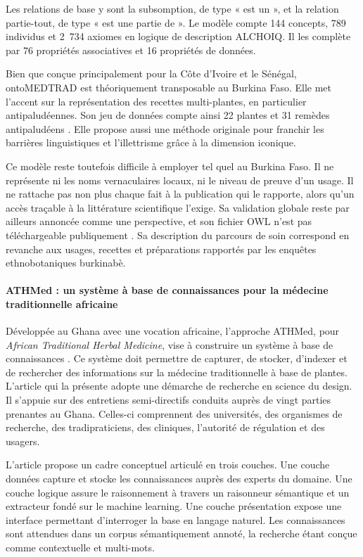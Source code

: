 Les relations de base y sont la subsomption, de type « est un », et la relation partie-tout, de type « est une partie de ». Le modèle compte 144 concepts, 789 individus et 2~734 axiomes en logique de description ALCHOIQ. Il les complète par 76 propriétés associatives et 16 propriétés de données.

Bien que conçue principalement pour la Côte d'Ivoire et le Sénégal, ontoMEDTRAD est théoriquement transposable au Burkina Faso. Elle met l'accent sur la représentation des recettes multi-plantes, en particulier antipaludéennes. Son jeu de données compte ainsi 22 plantes et 31 remèdes antipaludéens \cite{kouame_visual_2020}. Elle propose aussi une méthode originale pour franchir les barrières linguistiques et l'illettrisme grâce à la dimension iconique.

Ce modèle reste toutefois difficile à employer tel quel au Burkina Faso. Il ne représente ni les noms vernaculaires locaux, ni le niveau de preuve d'un usage. Il ne rattache pas non plus chaque fait à la publication qui le rapporte, alors qu'un accès traçable à la littérature scientifique l'exige. Sa validation globale reste par ailleurs annoncée comme une perspective, et son fichier OWL n'est pas téléchargeable publiquement \cite{kouame_systeme_2018}. Sa description du parcours de soin correspond en revanche aux usages, recettes et préparations rapportés par les enquêtes ethnobotaniques burkinabè.

\paragraph{ATHMed : un système à base de connaissances pour la médecine traditionnelle africaine}

Développée au Ghana avec une vocation africaine, l'approche ATHMed, pour \textit{African Traditional Herbal Medicine}, vise à construire un système à base de connaissances \cite{devine_knowledge_2022}. Ce système doit permettre de capturer, de stocker, d'indexer et de rechercher des informations sur la médecine traditionnelle à base de plantes. L'article qui la présente adopte une démarche de recherche en science du design. Il s'appuie sur des entretiens semi-directifs conduits auprès de vingt parties prenantes au Ghana. Celles-ci comprennent des universités, des organismes de recherche, des tradipraticiens, des cliniques, l'autorité de régulation et des usagers.

L'article propose un cadre conceptuel articulé en trois couches. Une couche données capture et stocke les connaissances auprès des experts du domaine. Une couche logique assure le raisonnement à travers un raisonneur sémantique et un extracteur fondé sur le machine learning. Une couche présentation expose une interface permettant d'interroger la base en langage naturel. Les connaissances sont attendues dans un corpus sémantiquement annoté, la recherche étant conçue comme contextuelle et multi-mots.

